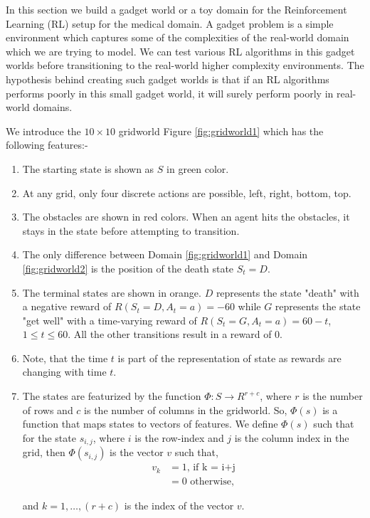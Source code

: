 In this section we build a gadget world or a toy domain for the Reinforcement Learning (RL) setup for the medical domain. A gadget problem is a simple environment which captures some of the complexities of the real-world domain which we are trying  to model. We can test various RL algorithms in this gadget worlds before transitioning to the real-world higher complexity environments. The hypothesis behind creating such gadget worlds is that if an RL algorithms performs poorly in this small gadget world, it will surely perform poorly in real-world domains.

We introduce the $10 \times 10$ gridworld Figure \ref{fig:gridworld1} which has the following features:-

\begin{enumerate}
\item The starting state is shown as $S$ in green color.
\item At any grid, only four discrete actions are possible, left, right, bottom, top.
\item The obstacles are shown in red colors. When an agent hits the obstacles, it stays in the state before attempting to transition.
\item The only difference between Domain \ref{fig:gridworld1} and Domain \ref{fig:gridworld2} is the position of the death state $S_t = D$. 
\item The terminal states are shown in orange. $D$ represents the state "death" with a negative reward of $R(S_t = D, A_t = a) = -60$ while $G$ represents the state "get well" with a time-varying reward of $R(S_t = G, A_t = a) = 60 - t$, $1\leq t \leq 60$. All the other transitions result in a reward of $0$.
\item Note, that the time $t$ is part of the representation of state as rewards are changing with time $t$.
\item The states are featurized by the function $\Phi: S \rightarrow R^{r+c}$, where $r$ is the number of rows and $c$ is the number of columns in the gridworld. So, $\Phi(s)$ is a function that maps states to vectors of features. We define $\Phi(s)$ such that for the state $s_{i,j}$, where $i$ is the row-index and $j$ is the column index in the grid, then $\Phi(s_{i,j})$ is the vector $v$ such that,
\begin{align*}
v_{k} &= 1 \text{, if k = i+j}\\
&= 0 \text{ otherwise,}
\end{align*}

and $k=1,\ldots,(r+c)$ is the index of the vector $v$.
\end{enumerate}

